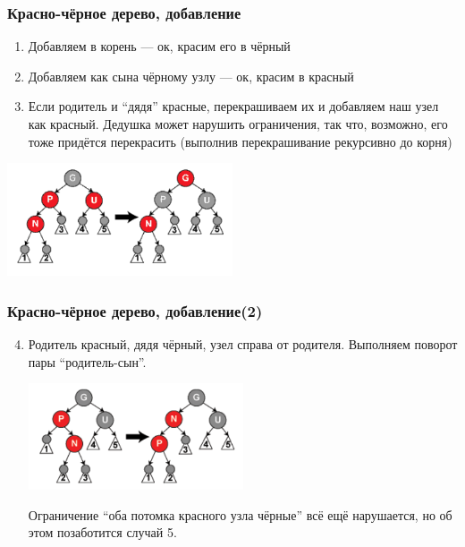\documentclass[xetex,mathserif,serif]{beamer}
\begin{document}
    \begin{frame}
        \frametitle{Красно-чёрное дерево, добавление}
        \begin{enumerate}
            \item Добавляем в корень --- ок, красим его в чёрный
            \item Добавляем как сына чёрному узлу --- ок, красим в красный
            \item Если родитель и ``дядя'' красные, перекрашиваем их и добавляем наш узел как красный. Дедушка может нарушить ограничения, так что, возможно, его тоже придётся перекрасить (выполнив перекрашивание рекурсивно до корня)
        \end{enumerate}
        \begin{center}
            \includegraphics[width=0.5\textwidth]{addition-to-red-black-tree.png}
        \end{center}
    \end{frame}

    \begin{frame}
        \frametitle{Красно-чёрное дерево, добавление(2)}
        \begin{enumerate}
            \setcounter{enumi}{3}
            \item Родитель красный, дядя чёрный, узел справа от родителя. Выполняем поворот пары ``родитель-сын''.
            \begin{center}
                \includegraphics[width=0.5\textwidth]{addition-to-red-black-tree2.png}
            \end{center}
            Ограничение ``оба потомка красного узла чёрные'' всё ещё нарушается, но об этом позаботится случай 5.
        \end{enumerate}
    \end{frame}
\end{document}
